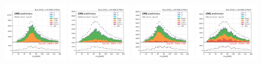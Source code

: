 \begin{figure}
    \includegraphics[width=0.24\textwidth]{chapters/Appendix/sectionQCD/figures/mutau_==1_==0_dilepton_mass.png}
    \includegraphics[width=0.24\textwidth]{chapters/Appendix/sectionQCD/figures/mutau_ss_==1_==0_dilepton_mass.png}
    \includegraphics[width=0.24\textwidth]{chapters/Appendix/sectionQCD/figures/etau_==1_==0_dilepton_mass.png}
    \includegraphics[width=0.24\textwidth]{chapters/Appendix/sectionQCD/figures/etau_ss_==1_==0_dilepton_mass.png}
    

\end{figure}
